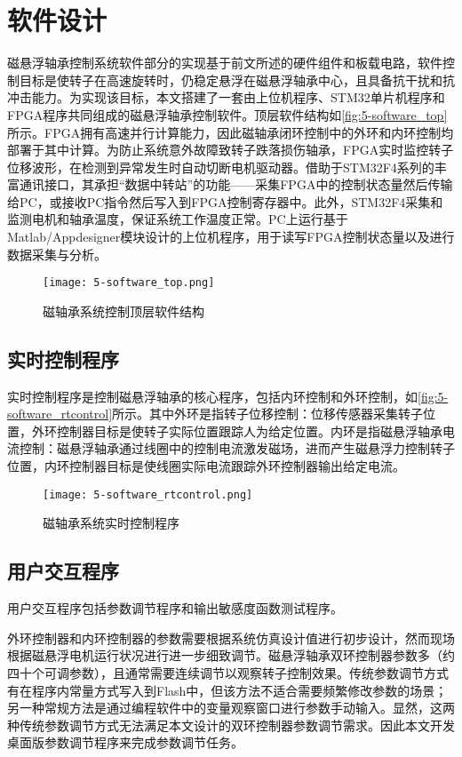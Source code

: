 \documentclass[
  lang=cn,
  degree=master,
  openany,oneside
]{nuaathesis}
\begin{document}
\section{软件设计}
磁悬浮轴承控制系统软件部分的实现基于前文所述的硬件组件和板载电路，软件控制目标是使转子在高速旋转时，仍稳定悬浮在磁悬浮轴承中心，且具备抗干扰和抗冲击能力。为实现该目标，本文搭建了一套由上位机程序、STM32单片机程序和FPGA程序共同组成的磁悬浮轴承控制软件。顶层软件结构如\autoref{fig:5-software_top}所示。FPGA拥有高速并行计算能力，因此磁轴承闭环控制中的外环和内环控制均部署于其中计算。为防止系统意外故障致转子跌落损伤轴承，FPGA实时监控转子位移波形，在检测到异常发生时自动切断电机驱动器。借助于STM32F4系列的丰富通讯接口，其承担“数据中转站”的功能——采集FPGA中的控制状态量然后传输给PC，或接收PC指令然后写入到FPGA控制寄存器中。此外，STM32F4采集和监测电机和轴承温度，保证系统工作温度正常。PC上运行基于Matlab/Appdesigner模块设计的上位机程序，用于读写FPGA控制状态量以及进行数据采集与分析。

\begin{figure}[h!]
	\texttt{[image: 5-software\_top.png]}
	\caption{磁轴承系统控制顶层软件结构}
	\label{fig:5-software_top}
\end{figure}

\subsection{实时控制程序}
实时控制程序是控制磁悬浮轴承的核心程序，包括内环控制和外环控制，如\autoref{fig:5-software_rtcontrol}所示。其中外环是指转子位移控制：位移传感器采集转子位置，外环控制器目标是使转子实际位置跟踪人为给定位置。内环是指磁悬浮轴承电流控制：磁悬浮轴承通过线圈中的控制电流激发磁场，进而产生磁悬浮力控制转子位置，内环控制器目标是使线圈实际电流跟踪外环控制器输出给定电流。

\begin{figure}[h!]
	\texttt{[image: 5-software\_rtcontrol.png]}
	\caption{磁轴承系统实时控制程序}
	\label{fig:5-software_rtcontrol}
\end{figure}

\subsection{用户交互程序}
用户交互程序包括参数调节程序和输出敏感度函数测试程序。

外环控制器和内环控制器的参数需要根据系统仿真设计值进行初步设计，然而现场根据磁悬浮电机运行状况进行进一步细致调节。磁悬浮轴承双环控制器参数多（约四十个可调参数），且通常需要连续调节以观察转子控制效果。传统参数调节方式有在程序内常量方式写入到Flash中，但该方法不适合需要频繁修改参数的场景；另一种常规方法是通过编程软件中的变量观察窗口进行参数手动输入。显然，这两种传统参数调节方式无法满足本文设计的双环控制器参数调节需求。因此本文开发桌面版参数调节程序来完成参数调节任务。
\end{document}
